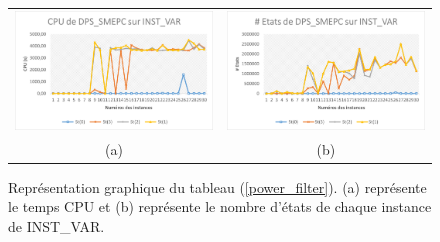 \begin{figure}[H]
	\centering
	\begin{tabular}{c c}
		\includegraphics[width=9cm]{images_these/CPU_DPS_SMEPC_INST_VAR.pdf}&
		\includegraphics[width=9cm]{images_these/Etats_DPS_SMEPC_INST_VAR.pdf}
		\\
		(a) & (b)
	\end{tabular}
	\caption[Représentation graphique du CPU et du gap du tableau (\ref{power_filter})]{Représentation graphique du tableau (\ref{power_filter}). (a) représente le temps CPU et (b) représente le nombre d'états de chaque instance de INST\_VAR.}\label{gap_cpu_dps_smepc_INST_VAR}
\end{figure}




			
